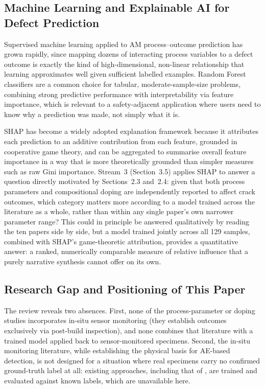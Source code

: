 \documentclass[a4paper]{article}
\begin{document}
\subsection{Machine Learning and Explainable AI for Defect Prediction}
Supervised machine learning applied to AM process--outcome prediction has grown rapidly, since mapping dozens of interacting process variables to a defect outcome is exactly the kind of high-dimensional, non-linear relationship that learning approximates well given sufficient labelled examples. Random Forest classifiers \citep{breiman2001} are a common choice for tabular, moderate-sample-size problems, combining strong predictive performance with interpretability via feature importance, which is relevant to a safety-adjacent application where users need to know why a prediction was made, not simply what it is.

SHAP \citep{lundberg2017} has become a widely adopted explanation framework because it attributes each prediction to an additive contribution from each feature, grounded in cooperative game theory, and can be aggregated to summarise overall feature importance in a way that is more theoretically grounded than simpler measures such as raw Gini importance. Stream~3 (Section~3.5) applies SHAP to answer a question directly motivated by Sections~2.3 and~2.4: given that both process parameters and compositional doping are independently reported to affect crack outcomes, which category matters more according to a model trained across the literature as a whole, rather than within any single paper's own narrower parameter range? This could in principle be answered qualitatively by reading the ten papers side by side, but a model trained jointly across all 129 samples, combined with SHAP's game-theoretic attribution, provides a quantitative answer: a ranked, numerically comparable measure of relative influence that a purely narrative synthesis cannot offer on its own.

\subsection{Research Gap and Positioning of This Paper}
The review reveals two absences. First, none of the process-parameter or doping studies incorporates in-situ sensor monitoring (they establish outcomes exclusively via post-build inspection), and none combines that literature with a trained model applied back to sensor-monitored specimens. Second, the in-situ monitoring literature, while establishing the physical basis for AE-based detection, is not designed for a situation where real specimens carry no confirmed ground-truth label at all: existing approaches, including that of \citet{wasmer2019}, are trained and evaluated against known labels, which are unavailable here.
\end{document}
